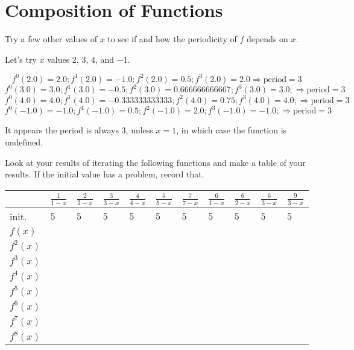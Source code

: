\documentclass[../key.tex]{subfiles}
\begin{document}
\section{Composition of Functions}

\begin{outer_problem}
\item Try a few other values of $x$ to see if and how the periodicity of $f$ depends on $x$.
\end{outer_problem}

Let's try $x$ values $2$, $3$, $4$, and $-1$.

$$f^0 (2.0) = 2.0; f^1 (2.0) = -1.0; f^2 (2.0) = 0.5; f^3 (2.0) = 2.0 \Longrightarrow \text{period} = 3$$
$$f^0 (3.0) = 3.0; f^1 (3.0) = -0.5; f^2 (3.0) = 0.666666666667; f^3 (3.0) = 3.0; \Longrightarrow \text{period} = 3$$
$$f^0 (4.0) = 4.0; f^1 (4.0) = -0.333333333333; f^2 (4.0) = 0.75; f^3 (4.0) = 4.0; \Longrightarrow \text{period} = 3$$
$$f^0 (-1.0) = -1.0; f^1 (-1.0) = 0.5; f^2 (-1.0) = 2.0; f^3 (-1.0) = -1.0; \Longrightarrow \text{period} = 3$$

It appears the period is always $3$, unless $x=1$, in which case the function is undefined.

\begin{outer_problem}
\item Look at your results of iterating the following functions and make a table of your results. If the initial value has a problem, record that.
\end{outer_problem}


\begin{tabular}{|l|l|l|l|l|l|l|l|l|l|l|}
\hline
         & $\frac{1}{1-x}$ & $\frac{2}{2-x}$ & $\frac{3}{3-x}$ & $\frac{4}{4-x}$ & $\frac{5}{5-x}$ & $\frac{7}{7-x}$ & $\frac{6}{1-x}$ & $\frac{6}{2-x}$ & $\frac{6}{3-x}$ & $\frac{9}{3-x}$ \\ \hline
init.    & $5$   & $5$   & $5$ & $5$ & $5$ & $5$ & $5$ & $5$ & $5$ & $5$ \\ \hline
$f(x)$   &       &       &   &   &   &   &   &   &   &   \\ \hline
$f^2(x)$ &       &       &   &   &   &   &   &   &   &   \\ \hline
$f^3(x)$ &       &       &   &   &   &   &   &   &   &   \\ \hline
$f^4(x)$ &       &       &   &   &   &   &   &   &   &   \\ \hline
$f^5(x)$ &       &       &   &   &   &   &   &   &   &   \\ \hline
$f^6(x)$ &       &       &   &   &   &   &   &   &   &   \\ \hline
$f^7(x)$ &       &       &   &   &   &   &   &   &   &   \\ \hline
$f^8(x)$ &       &       &   &   &   &   &   &   &   &   \\ \hline
\end{tabular}
\end{document}
